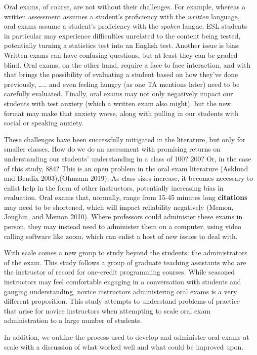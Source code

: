 \documentclass[
  letterpaper,
  DIV=11,
  numbers=noendperiod]{scrartcl}
\begin{document}
Oral exams, of course, are not without their challenges. For example,
whereas a written assessment assumes a student's proficiency with the
\emph{written} language, oral exams assume a student's proficiency with
the \emph{spoken} langue. ESL students in particular may experience
difficulties unrelated to the content being tested, potentially turning
a statistics test into an English test. Another issue is bias: Written
exams can have confusing questions, but at least they can be graded
blind. Oral exams, on the other hand, require a face to face
interaction, and with that brings the possibility of evaluating a
student based on how they've done previously, \ldots.. and even feeling
hungry (as one TA mentions later) need to be carefully evaluated.
Finally, oral exams may not only negatively impact our students with
test anxiety (which a written exam also might), but the new format may
make that anxiety worse, along with pulling in our students with social
or speaking anxiety.

These challenges have been successfully mitigated in the literature, but
only for smaller classes. How do we do an assessment with promising
returns on understanding our students' understanding in a class of 100?
200? Or, in the case of this study, 884? This is an open problem in the
oral exam literature (Asklund and Bendix 2003),(Ohmann 2019). As class
sizes increase, it becomes necessary to enlist help in the form of other
instructors, potentially increasing bias in evaluation. Oral exams that,
normally, range from 15-45 minutes long \textbf{citations} may need to
be shortened, which will impact reliability negatively (Memon, Joughin,
and Memon 2010). Where professors could administer these exams in
person, they may instead need to administer them on a computer, using
video calling software like zoom, which can enlist a host of new issues
to deal with.

With scale comes a new group to study beyond the students: the
administrators of the exam. This study follows a group of graduate
teaching assistants who are the instructor of record for one-credit
programming courses. While seasoned instructors may feel comfortable
engaging in a conversation with students and gauging understanding,
novice instructors administering oral exams is a very different
proposition. This study attempts to understand problems of practice that
arise for novice instructors when attempting to scale oral exam
administration to a large number of students.

In addition, we outline the process used to develop and administer oral
exams at scale with a discussion of what worked well and what could be
improved upon.
\end{document}
